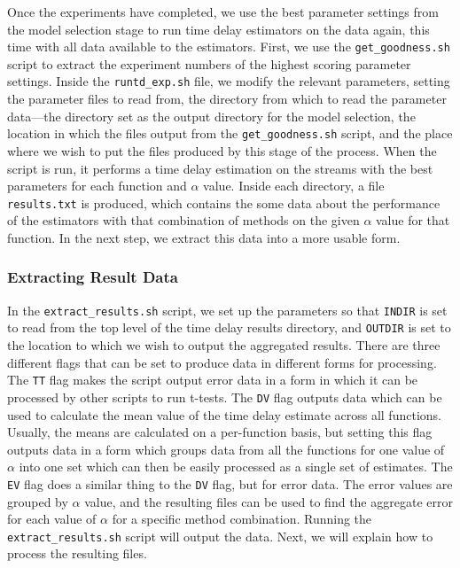 \documentclass[a4paper,11pt]{article}
\begin{document}
\begin{appendices}
Once the experiments have completed, we use the best parameter settings from the
model selection stage to run time delay estimators on the data again, this time
with all data available to the estimators. First, we use the
\texttt{get\_goodness.sh} script to extract the experiment numbers of the
highest scoring parameter settings. Inside the \texttt{runtd\_exp.sh} file, we
modify the relevant parameters, setting the parameter files to read from, the
directory from which to read the parameter data---the directory set as the
output directory for the model selection, the location in which the files output
from the \texttt{get\_goodness.sh} script, and the place where we wish to put
the files produced by this stage of the process. When the script is run, it
performs a time delay estimation on the streams with the best parameters for
each function and $\alpha$ value. Inside each directory, a file
\texttt{results.txt} is produced, which contains the some data about the
performance of the estimators with that combination of methods on the given
$\alpha$ value for that function. In the next step, we extract this data into a
more usable form.
\subsubsection{Extracting Result Data}
\label{sec-10-3-6}

In the \texttt{extract\_results.sh} script, we set up the parameters so that
\texttt{INDIR} is set to read from the top level of the time delay results
directory, and \texttt{OUTDIR} is set to the location to which we wish to output
the aggregated results. There are three different flags that can be set to
produce data in different forms for processing. The \texttt{TT} flag makes the
script output error data in a form in which it can be processed by other scripts
to run t-tests. The \texttt{DV} flag outputs data which can be used to calculate
the mean value of the time delay estimate across all functions. Usually, the
means are calculated on a per-function basis, but setting this flag outputs data
in a form which groups data from all the functions for one value of $\alpha$
into one set which can then be easily processed as a single set of
estimates. The \texttt{EV} flag does a similar thing to the \texttt{DV} flag,
but for error data. The error values are grouped by $\alpha$ value, and the
resulting files can be used to find the aggregate error for each value of
$\alpha$ for a specific method combination. Running the
\texttt{extract\_results.sh} script will output the data. Next, we will explain
how to process the resulting files.

\end{appendices}
\end{document}
